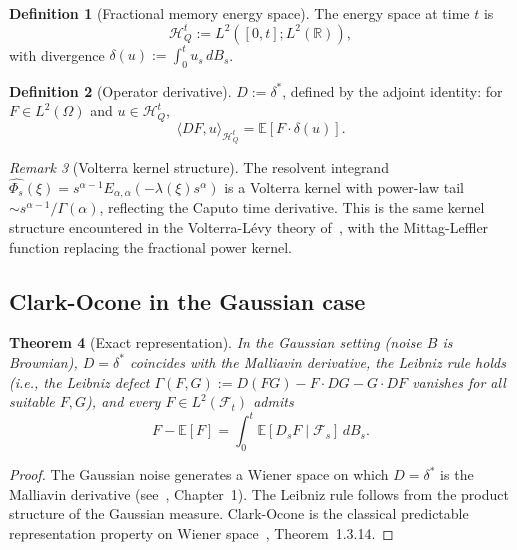 \documentclass[11pt]{article}
\newtheorem{theorem}{Theorem}[section]
\theoremstyle{definition}
\newtheorem{definition}[theorem]{Definition}
\theoremstyle{remark}
\newtheorem{remark}[theorem]{Remark}
\newcommand{\E}{\mathbb{E}}
\newcommand{\R}{\mathbb{R}}
\newcommand{\HH}{\mathcal{H}}
\newcommand{\FF}{\mathcal{F}}
\newcommand{\ip}[2]{\langle #1, #2 \rangle}
\begin{document}
\begin{definition}[Fractional memory energy space]
\label{def:energy_space}
The energy space at time $t$ is
\[
\HH_Q^t := L^2([0,t]; L^2(\R)),
\]
with divergence $\delta(u) := \int_0^t u_s\, dB_s$.
\end{definition}

\begin{definition}[Operator derivative]
\label{def:D_quijotic}
$D := \delta^*$, defined by the adjoint identity:
for $F \in L^2(\Omega)$ and $u \in \HH_Q^t$,
\begin{equation}\label{eq:adjoint_identity}
\ip{DF}{u}_{\HH_Q^t} = \E[F \cdot \delta(u)].
\end{equation}
\end{definition}

\begin{remark}[Volterra kernel structure]
The resolvent integrand $\widehat{\Phi_s}(\xi)
= s^{\alpha-1}
E_{\alpha,\alpha}(-\lambda(\xi) s^\alpha)$
is a Volterra kernel with power-law tail
$\sim s^{\alpha-1}/\Gamma(\alpha)$, reflecting the
Caputo time derivative.  This is the same kernel
structure encountered in the Volterra-L\'evy theory
of~\cite{fontes2026volterra}, with the Mittag-Leffler
function replacing the fractional power kernel.
\end{remark}

\subsection{Clark-Ocone in the Gaussian case}

\begin{theorem}[Exact representation]
\label{thm:clark_ocone}
In the Gaussian setting (noise $B$ is Brownian),
$D = \delta^*$ coincides with the Malliavin derivative,
the Leibniz rule holds (i.e., the Leibniz defect
$\Gamma(F,G) := D(FG) - F \cdot DG - G \cdot DF$
vanishes for all suitable $F, G$), and every
$F \in L^2(\FF_t)$ admits
\begin{equation}\label{eq:clark_ocone}
F - \E[F] = \int_0^t
\E[D_s F \mid \FF_s]\, dB_s.
\end{equation}
\end{theorem}

\begin{proof}
The Gaussian noise generates a Wiener space on which
$D = \delta^*$ is the Malliavin derivative
(see~\cite{nualart2006}, Chapter~1).  The Leibniz rule
follows from the product structure of the Gaussian
measure.  Clark-Ocone is the classical predictable
representation property on Wiener
space~\cite{nualart2006}, Theorem~1.3.14.
\end{proof}
\end{document}
